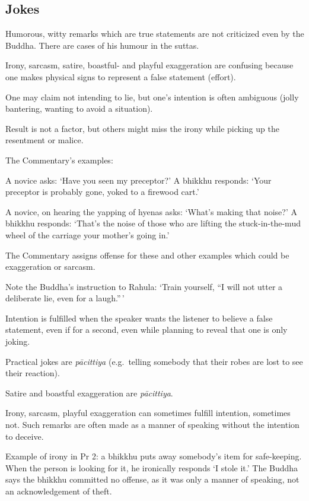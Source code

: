 \subsection{Jokes}

Humorous, witty remarks which are true statements are not criticized
even by the Buddha. There are cases of his humour in the suttas.

Irony, sarcasm, satire, boastful- and playful exaggeration are confusing
because one makes physical signs to represent a false statement
(effort).

One may claim not intending to lie, but one's intention is often
ambiguous (jolly bantering, wanting to avoid a situation).

Result is not a factor, but others might miss the irony while picking up
the resentment or malice.

The Commentary's examples:

A novice asks: `Have you seen my preceptor?' A bhikkhu responds: `Your
preceptor is probably gone, yoked to a firewood cart.'

A novice, on hearing the yapping of hyenas asks: `What's making that
noise?' A bhikkhu responds: `That's the noise of those who are lifting
the stuck-in-the-mud wheel of the carriage your mother's going in.'

The Commentary assigns offense for these and other examples which could
be exaggeration or sarcasm.

Note the Buddha's instruction to Rahula: `Train yourself, ``I will not
utter a deliberate lie, even for a laugh.''\,'

Intention is fulfilled when the speaker wants the listener to believe a
false statement, even if for a second, even while planning to reveal
that one is only joking.

Practical jokes are \emph{pācittiya} (e.g.~telling somebody that their
robes are lost to see their reaction).

Satire and boastful exaggeration are \emph{pācittiya}.

Irony, sarcasm, playful exaggeration can sometimes fulfill intention,
sometimes not. Such remarks are often made as a manner of speaking
without the intention to deceive.

Example of irony in Pr 2: a bhikkhu puts away somebody's item for
safe-keeping. When the person is looking for it, he ironically responds
`I stole it.' The Buddha says the bhikkhu committed no offense, as it
was only a manner of speaking, not an acknowledgement of theft.

